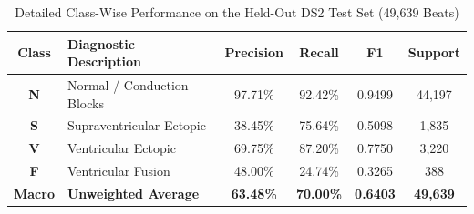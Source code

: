 \begin{table}[t]
\centering
\caption{Detailed Class-Wise Performance on the Held-Out DS2 Test Set (49,639 Beats)}
\label{tab:classwise_ds2}
\begin{tabular}{clcccc}
\hline
\textbf{Class} & \textbf{Diagnostic Description} & \textbf{Precision} & \textbf{Recall} & \textbf{F1} & \textbf{Support} \\
\hline
\textbf{N} & Normal / Conduction Blocks & 97.71\% & 92.42\% & 0.9499 & 44,197 \\
\textbf{S} & Supraventricular Ectopic   & 38.45\% & 75.64\% & 0.5098 & 1,835 \\
\textbf{V} & Ventricular Ectopic        & 69.75\% & 87.20\% & 0.7750 & 3,220 \\
\textbf{F} & Ventricular Fusion         & 48.00\% & 24.74\% & 0.3265 & 388 \\
\hline
\textbf{Macro} & \textbf{Unweighted Average} & \textbf{63.48\%} & \textbf{70.00\%} & \textbf{0.6403} & \textbf{49,639} \\
\hline
\end{tabular}
\end{table}
